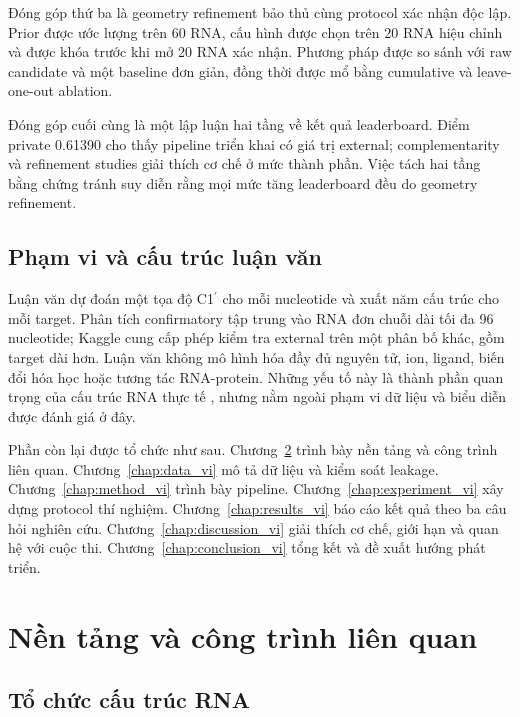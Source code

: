 \documentclass[12pt,a4paper,oneside]{report}
\newcommand{\cprime}{C1$^{\prime}$}
\begin{document}
Đóng góp thứ ba là geometry refinement bảo thủ cùng protocol xác nhận độc lập. Prior
được ước lượng trên 60 RNA, cấu hình được chọn trên 20 RNA hiệu chỉnh và được khóa trước
khi mở 20 RNA xác nhận. Phương pháp được so sánh với raw candidate và một baseline đơn
giản, đồng thời được mổ bằng cumulative và leave-one-out ablation.

Đóng góp cuối cùng là một lập luận hai tầng về kết quả leaderboard. Điểm private
0.61390 cho thấy pipeline triển khai có giá trị external; complementarity và refinement
studies giải thích cơ chế ở mức thành phần. Việc tách hai tầng bằng chứng tránh suy diễn
rằng mọi mức tăng leaderboard đều do geometry refinement.

\section{Phạm vi và cấu trúc luận văn}

Luận văn dự đoán một tọa độ \cprime{} cho mỗi nucleotide và xuất năm cấu trúc cho mỗi
target. Phân tích confirmatory tập trung vào RNA đơn chuỗi dài tối đa 96 nucleotide;
Kaggle cung cấp phép kiểm tra external trên một phân bố khác, gồm target dài hơn. Luận
văn không mô hình hóa đầy đủ nguyên tử, ion, ligand, biến đổi hóa học hoặc tương tác
RNA-protein. Những yếu tố này là thành phần quan trọng của cấu trúc RNA thực tế
\cite{butcher_tertiary,zhang_experimental_review}, nhưng nằm ngoài phạm vi dữ liệu và
biểu diễn được đánh giá ở đây.

Phần còn lại được tổ chức như sau. Chương~\ref{chap:background_vi} trình bày nền tảng và
công trình liên quan. Chương~\ref{chap:data_vi} mô tả dữ liệu và kiểm soát leakage.
Chương~\ref{chap:method_vi} trình bày pipeline. Chương~\ref{chap:experiment_vi} xây dựng
protocol thí nghiệm. Chương~\ref{chap:results_vi} báo cáo kết quả theo ba câu hỏi nghiên
cứu. Chương~\ref{chap:discussion_vi} giải thích cơ chế, giới hạn và quan hệ với cuộc thi.
Chương~\ref{chap:conclusion_vi} tổng kết và đề xuất hướng phát triển.

\chapter{Nền tảng và công trình liên quan}
\label{chap:background_vi}

\section{Tổ chức cấu trúc RNA}
\end{document}
